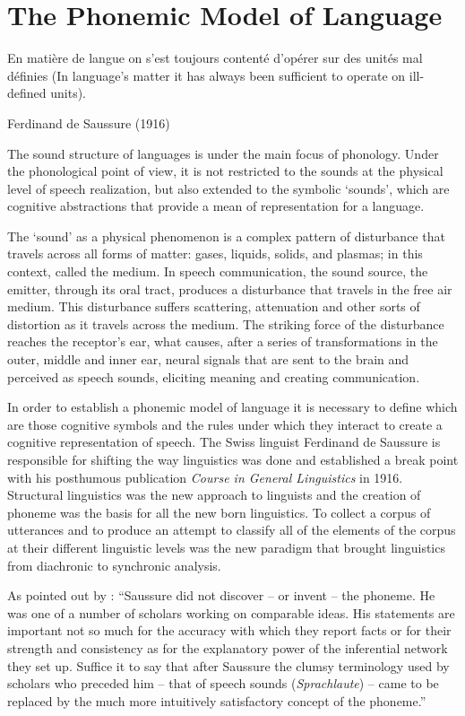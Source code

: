 \chapter{The Phonemic Model of Language}
\epigraph{En matière de langue on s’est toujours contenté d’opérer sur des unités mal définies (In language's matter it has always been sufficient to operate on ill-defined units).}{Ferdinand de Saussure (1916)}

The sound structure of languages is under the main focus of phonology. Under the phonological point of view, it is not restricted to the sounds at the physical level of speech realization, but also extended to the symbolic `sounds', which are cognitive abstractions that provide a mean of representation for a language.

The `sound' as a physical phenomenon is a complex pattern of disturbance that travels across all forms of matter: gases, liquids, solids, and plasmas; in this context, called the medium. In speech communication, the sound source, the emitter, through its oral tract, produces a disturbance that travels in the free air medium. This disturbance suffers scattering, attenuation and other sorts of distortion as it travels across the medium. The striking force of the disturbance reaches the receptor's ear, what causes, after a series of transformations in the outer, middle and inner ear, neural signals that are sent to the brain and perceived as speech sounds, eliciting meaning and creating communication.

In order to establish a phonemic model of language it is necessary to define which are those cognitive symbols and the rules under which they interact to create a cognitive representation of speech. The Swiss linguist Ferdinand de Saussure is responsible for shifting the way linguistics was done and established a break point with his posthumous publication \textit{Course in General Linguistics} in 1916. Structural linguistics was the new approach to linguists and the creation of phoneme was the basis for all the new born linguistics. To collect a corpus of utterances and to produce an attempt to classify all of the elements of the corpus at their different linguistic levels was the new paradigm that brought linguistics from diachronic to synchronic analysis.

As pointed out by \cite{capek1983}: ``Saussure did not discover -- or invent -- the phoneme. He was one of a number of scholars working on comparable ideas. His statements are important not so much for the accuracy with which they report facts or for their strength and consistency as for the explanatory power of the inferential network they set up. Suffice it to say that after Saussure the clumsy terminology used by scholars who preceded him -- that of speech sounds (\textit{Sprachlaute})  -- came to be replaced by the much more intuitively satisfactory concept of the phoneme.''

